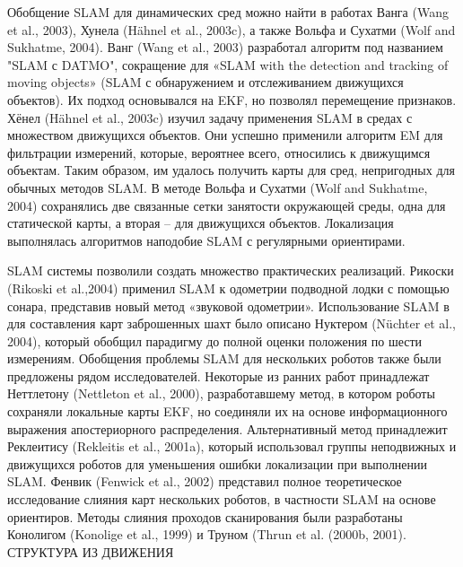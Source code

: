 \documentclass[10pt,a4paper]{article}
\begin{document}
Обобщение SLAM для динамических сред можно найти в работах Ванга (Wang et al., 2003), Хунела (Hähnel  et al., 2003c), а также Вольфа и Сухатми (Wolf and Sukhatme, 2004). Ванг (Wang et al., 2003) разработал алгоритм под названием "SLAM с DATMO", сокращение для «SLAM with the detection and tracking of moving objects» (SLAM с обнаружением и отслеживанием движущихся объектов). Их подход основывался на EKF, но позволял перемещение признаков. Хёнел (Hähnel et al., 2003c) изучил задачу применения SLAM в средах с множеством движущихся объектов. Они успешно применили алгоритм EM для фильтрации измерений, которые, вероятнее всего, относились к движущимся объектам. Таким образом, им удалось получить карты для сред, непригодных для обычных методов SLAM. В методе Вольфа и Сухатми (Wolf and Sukhatme, 2004) сохранялись две связанные сетки занятости окружающей среды, одна для статической карты, а вторая – для движущихся объектов. Локализация выполнялась алгоритмов наподобие SLAM с регулярными ориентирами.

SLAM системы позволили создать множество практических реализаций. Рикоски (Rikoski et al.,2004) применил SLAM к одометрии подводной лодки с помощью сонара, представив новый метод «звуковой одометрии». Использование SLAM в для составления карт заброшенных шахт было описано Нуктером (Nüchter et al., 2004), который обобщил парадигму до полной оценки положения по шести измерениям. Обобщения проблемы SLAM для нескольких роботов также были предложены рядом исследователей. Некоторые из ранних работ принадлежат Неттлетону (Nettleton et al., 2000), разработавшему метод, в котором роботы сохраняли локальные карты EKF, но соединяли их на основе информационного выражения апостериорного распределения. Альтернативный метод принадлежит Реклеитису (Rekleitis et al., 2001a), который использовал группы неподвижных и движущихся роботов для уменьшения ошибки локализации при выполнении SLAM. Фенвик (Fenwick et al., 2002) представил полное теоретическое исследование слияния карт нескольких роботов, в частности SLAM на основе ориентиров. Методы слияния проходов сканирования были разработаны Конолигом (Konolige et al., 1999) и Труном (Thrun et al. (2000b, 2001).\\

СТРУКТУРА ИЗ ДВИЖЕНИЯ\\
\end{document}
